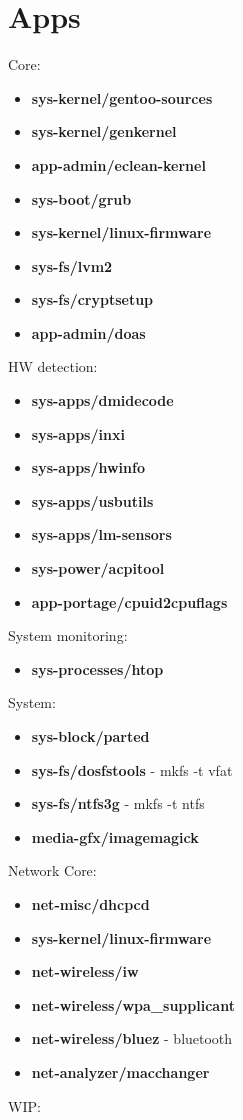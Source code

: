 \documentclass[10pt, a4paper, onecolumn, openany]{book}         %
\begin{document}
\chapter{Apps}
Core:
\begin{itemize}
    \item \textbf{sys-kernel/gentoo-sources}
    \item \textbf{sys-kernel/genkernel}
    \item \textbf{app-admin/eclean-kernel}
    \item \textbf{sys-boot/grub}
    \item \textbf{sys-kernel/linux-firmware}
    \item \textbf{sys-fs/lvm2}
    \item \textbf{sys-fs/cryptsetup}
    \item \textbf{app-admin/doas}
\end{itemize}
HW detection:
\begin{itemize}
    \item \textbf{sys-apps/dmidecode}
    \item \textbf{sys-apps/inxi}
    \item \textbf{sys-apps/hwinfo}
    \item \textbf{sys-apps/usbutils}
    \item \textbf{sys-apps/lm-sensors}
    \item \textbf{sys-power/acpitool}
    \item \textbf{app-portage/cpuid2cpuflags}
\end{itemize}
System monitoring:
\begin{itemize}
    \item \textbf{sys-processes/htop}
\end{itemize}
System:
\begin{itemize}
    \item \textbf{sys-block/parted}
    \item \textbf{sys-fs/dosfstools} - mkfs -t vfat
    \item \textbf{sys-fs/ntfs3g} - mkfs -t ntfs
    \item \textbf{media-gfx/imagemagick}
\end{itemize}
Network Core:
\begin{itemize}
    \item \textbf{net-misc/dhcpcd}
    \item \textbf{sys-kernel/linux-firmware}
    \item \textbf{net-wireless/iw}
    \item \textbf{net-wireless/wpa\_supplicant}
    \item \textbf{net-wireless/bluez} - bluetooth
    \item \textbf{net-analyzer/macchanger}
\end{itemize}
WIP:
\end{document}
